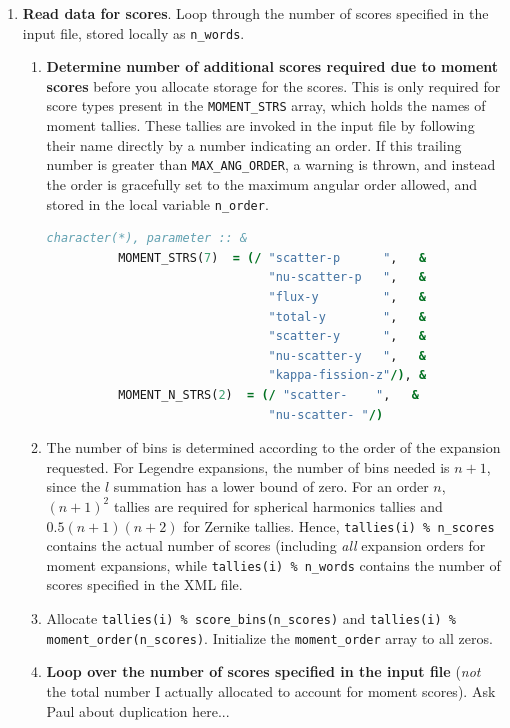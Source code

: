 \documentclass[10pt]{article}
\numberwithin{equation}{section} %
\begin{document}
\begin{enumerate}
\begin{enumerate}
	\item {\bf Read data for scores}. Loop through the number of scores specified in the input file, stored locally as {\tt n\_words}.
		
		\begin{enumerate}
		\item {\bf Determine number of additional scores required due to moment scores} before you allocate storage for the scores. This is only required for score types present in the {\tt MOMENT\_STRS} array, which holds the names of moment tallies. These tallies are invoked in the input file by following their name directly by a number indicating an order. If this trailing number is greater than {\tt MAX\_ANG\_ORDER}, a warning is thrown, and instead the order is gracefully set to the maximum angular order allowed, and stored in the local variable {\tt n\_order}.

\begin{lstlisting}[language=Fortran]
		character(*), parameter :: &
          MOMENT_STRS(7)  = (/ "scatter-p      ",   &
                               "nu-scatter-p   ",   &
                               "flux-y         ",   &
                               "total-y        ",   &
                               "scatter-y      ",   &
                               "nu-scatter-y   ",   &
                               "kappa-fission-z"/), &
          MOMENT_N_STRS(2)  = (/ "scatter-    ",   &
                               "nu-scatter- "/)
\end{lstlisting}

		\item The number of bins is determined according to the order of the expansion requested. For Legendre expansions, the number of bins needed is \(n+1\), since the \(l\) summation has a lower bound of zero. For an order \(n\), \((n+1)^2\) tallies are required for spherical harmonics tallies and \(0.5(n+1)(n+2)\) for Zernike tallies. Hence, {\tt tallies(i) \% n\_scores} contains the actual number of scores (including {\it all} expansion orders for moment expansions, while {\tt tallies(i) \% n\_words} contains the number of scores specified in the XML file.  
		\item Allocate {\tt tallies(i) \% score\_bins(n\_scores)} and {\tt tallies(i) \% moment\_order(n\_scores)}. Initialize the {\tt moment\_order} array to all zeros. 
		\item {\bf Loop over the number of scores specified in the input file} ({\it not} the total number I actually allocated to account for moment scores). Ask Paul about duplication here...
			

\end{enumerate}
\end{enumerate}
\end{enumerate}
\end{document}
